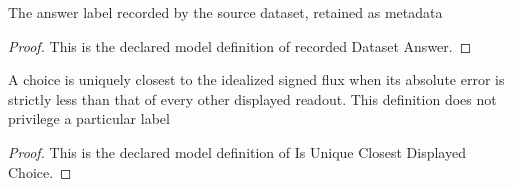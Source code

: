 \begin{definition}
  \label{def:physics:phyx-mini-0998:phyxminiproblems-problemphyxmini0998-recordeddatasetanswer}
  The answer label recorded by the source dataset, retained as metadata
\end{definition}
\begin{proof}
  This is the declared model definition of recorded Dataset Answer.
\end{proof}
\begin{definition}
  \label{def:physics:phyx-mini-0998:phyxminiproblems-problemphyxmini0998-isuniqueclosestdisplayedchoice}
  A choice is uniquely closest to the idealized signed flux when its absolute error is strictly less than that of every other displayed readout. This definition does not privilege a particular label
\end{definition}
\begin{proof}
  This is the declared model definition of Is Unique Closest Displayed Choice.
\end{proof}
